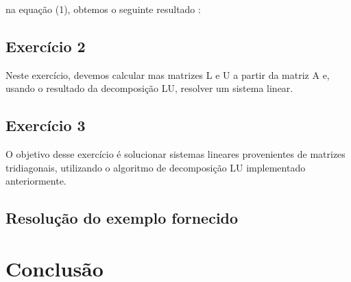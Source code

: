 \documentclass{article}
\begin{document}
na equação (1), obtemos o seguinte resultado :

\subsection{Exercício 2}

Neste exercício, devemos calcular mas matrizes L e U a partir da matriz A e, usando o resultado da decomposição LU, resolver um sistema linear.  


\subsection{Exercício 3} 

O objetivo desse exercício é solucionar sistemas lineares provenientes de matrizes tridiagonais, utilizando o algoritmo de decomposição LU implementado anteriormente. 

\subsection{Resolução do exemplo fornecido}

\section{Conclusão}





\end{document}
